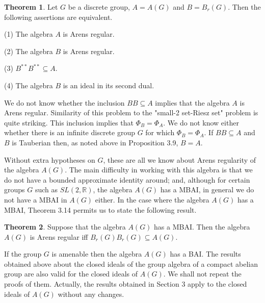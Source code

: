 \documentclass[12pt, twoside, leqno]{article}
\theoremstyle{definition}
\newtheorem{theorem}{Theorem}[section]
\theoremstyle{definition}
\numberwithin{equation}{section}
\begin{document}
 \begin{theorem}
 	Let $ G $ be a discrete group, $ A=A(G) $ and $ B=B_{r}(G) $. Then the following assertions are equivalent.\vspace{2mm}
 	
 	(1) The algebra $ A $ is Arens regular.\vspace{2mm}
 	
 	(2) The algebra $ B $ is Arens regular.\vspace{2mm}
 	
 	(3) $ B^{**}B^{**}\subseteq A $.\vspace{2mm}
 	
 	(4) The algebra $ B $ is an ideal in its second dual.
 	
 \end{theorem} 
We do not know whether the inclusion $ BB\subseteq A $ implies that the algebra $ A $ is Arens regular. Similarity of this problem to the "small-2 set-Riesz set" problem is quite striking. This inclusion implies that $ \Phi_{B}=\Phi_{A} $. We do not know either whether there is an infinite discrete group $ G $ for which $ \Phi_{B}=\Phi_{A} $. If $ BB\subseteq A $ and $ B $ is Tauberian then, as noted above in Proposition 3.9, $ B=A $.\vspace{2mm}
  
  Without extra hypotheses on $G$, these are all we know about Arens regularity of the algebra $ A(G) $. The main difficulty in working with this algebra is that we do not have a bounded approximate identity around; and, although for certain groups $G$ such as  $SL(2,\mathbb{R})$, the algebra $A(G)$ has a MBAI, in general we do not have a MBAI in $ A(G) $ either. In the case where the algebra $A(G)$ has a MBAI, Theorem 3.14 permits us to state the following result.
  \begin{theorem} Suppose that the algebra $A(G)$ has a MBAI. Then the algebra $A(G)$ is Arens regular iff $B_{r}(G)B_{r}(G)\subseteq A(G)$.
  	
  \end{theorem}
  If the group $G$ is amenable then the algebra $A(G)$ has a BAI. The results obtained above about the closed ideals of the group algebra of a compact abelian group are also valid for the closed ideals of $A(G)$. We shall not repeat the proofs of them. Actually, the results obtained in Section 3 apply to the closed ideals of $A(G)$ without any changes.
  
  
  
  \vspace{4mm}
  
\end{document}
